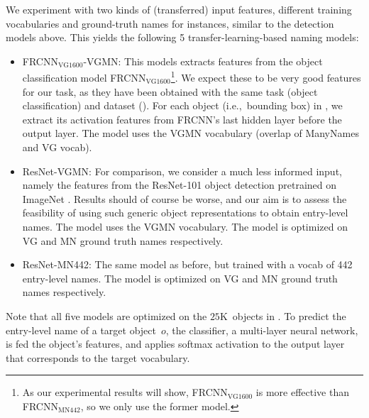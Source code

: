 We experiment with two kinds of (transferred) input features, different training vocabularies and ground-truth names for instances, similar to the detection models above.
This yields the following 5 transfer-learning-based naming models:

\begin{itemize}
\item FRCNN$_{\text{VG1600}}$-VGMN:  This models extracts features from the object classification model FRCNN$_{\text{VG1600}}$\footnote{As our experimental results will show, FRCNN$_{\text{VG1600}}$ is more effective than FRCNN$_{\text{MN442}}$, so we only use the former model.}. We expect these to be very good features for our task, as they have been obtained with the same task (object classification) and dataset (\vg).  For each object (i.e.,~bounding box) in \mn, we extract its activation features from FRCNN's last hidden layer before the output layer. The model uses the VGMN vocabulary (overlap of ManyNames and VG vocab).
\item ResNet-VGMN: For comparison, we consider a much less informed input, namely the features from the ResNet-101 object detection  pretrained on ImageNet \cite{+++}.
Results should of course be worse, and our aim is to assess the feasibility of using such generic object representations to obtain entry-level names. The model uses the VGMN vocabulary.  The model is optimized on VG and MN ground truth names respectively.
 \item  ResNet-MN442:  The same model as before, but trained with a vocab of 442 entry-level names. The model is optimized on VG and MN ground truth names respectively.
\end{itemize}


Note that all five models are optimized on the $25$K~objects in \mn. 
To predict the entry-level name of a target object~$o$, the classifier, a multi-layer neural network, is fed the object's features, and applies softmax activation to the output layer that corresponds to the target vocabulary. 

